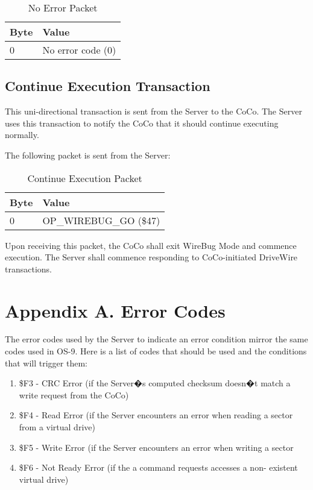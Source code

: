 \documentclass{article}
\begin{document}
\begin{table}[ht]
\caption{No Error Packet}
\begin{center}
\begin{tabular}{|ll|}
\hline
Byte & Value \\ \hline
0 & No error code (0) \\
\hline
\end{tabular}
\end{center}
\end{table}


\subsection{Continue Execution Transaction}
This uni-directional transaction is sent from the Server to the CoCo. The Server uses this transaction to notify the CoCo that it should continue executing normally.

The following packet is sent from the Server:

\begin{table}[ht]
\caption{Continue Execution Packet}
\begin{center}
\begin{tabular}{|ll|}
\hline
Byte & Value \\ \hline
0 & OP\_WIREBUG\_GO (\$47) \\
\hline
\end{tabular}
\end{center}
\end{table}

Upon receiving this packet, the CoCo shall exit WireBug Mode and commence execution.	The Server shall commence responding to CoCo-initiated DriveWire transactions.

\section{Appendix A. Error Codes}
The error codes used by the Server to indicate an error condition mirror the same codes used in OS-9.	Here is a list of codes that should be used and the conditions that will trigger them:

\begin{enumerate}
\item \$F3 - CRC Error (if the Server�s computed checksum doesn�t match a write request from the CoCo)
\item \$F4 - Read Error (if the Server encounters an error when reading a sector from a virtual drive)
\item \$F5 - Write Error (if the Server encounters an error when writing a sector
\item \$F6	- Not Ready Error (if the a command requests accesses a non- existent virtual drive)
\end{enumerate}
\end{document}
